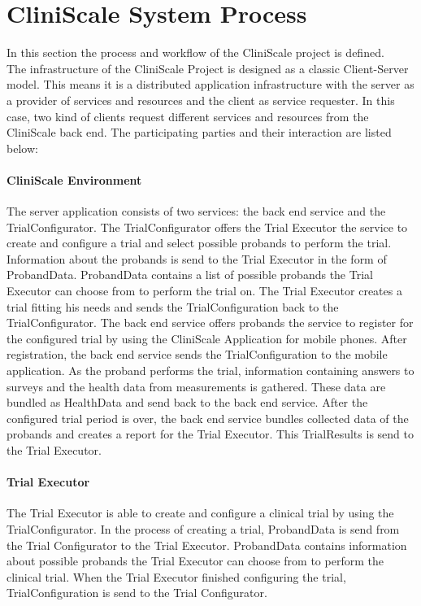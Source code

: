 \section{CliniScale System Process}
\label{sysrequirements}

In this section the process and workflow of the CliniScale project is defined.
\\
The infrastructure of the CliniScale Project is designed as a classic Client-Server model. This means it is a distributed application infrastructure with the server as a provider of services and resources and the client as service requester. In this case, two kind of clients request different services and resources from the CliniScale back end. The participating parties and their interaction are listed below:

\paragraph{CliniScale Environment} The server application consists of two services: the back end service and the TrialConfigurator. 
The TrialConfigurator offers the Trial Executor the service to create and configure a trial and select possible probands to perform the trial. Information about the probands is send to the Trial Executor in the form of ProbandData. ProbandData contains a list of possible probands the Trial Executor can choose from to perform the trial on. 
The Trial Executor creates a trial fitting his needs and sends the TrialConfiguration back to the TrialConfigurator. 
The back end service offers probands the service to register for the configured trial by using the CliniScale Application for mobile phones. After registration, the back end service sends the TrialConfiguration to the mobile application. As the proband performs the trial, information containing answers to surveys and the health data from measurements is gathered. These data are bundled as HealthData and send back to the back end service. 
After the configured trial period is over, the back end service bundles collected data of the probands and creates a report for the Trial Executor. This TrialResults is send to the Trial Executor.

\paragraph{Trial Executor} The Trial Executor is able to create and configure a clinical trial by using the TrialConfigurator. In the process of creating a trial, ProbandData is send from the Trial Configurator to the Trial Executor. ProbandData contains information about possible probands the Trial Executor can choose from to perform the clinical trial. When the Trial Executor finished configuring the trial, TrialConfiguration is send to the Trial Configurator.

